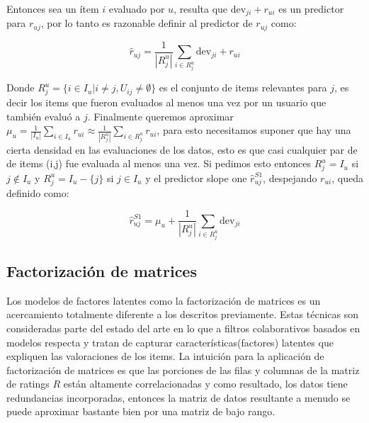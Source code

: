 \documentclass[hidelinks,12pt,a4paper]{book}
\theoremstyle{plain}
\theoremstyle{definition}
\begin{document}
Entonces sea un ítem $i$ evaluado por $u$, resulta que $\text{dev}_{ji}+r_{ui}$ es un predictor para $r_{uj}$, por lo tanto es razonable definir al predictor de $r_{uj}$ como:

\begin{equation}
\hat{r}_{uj} = \frac{1}{|R_j^u|} \sum_{i \in R_j^u} \text{dev}_{ji}+r_{ui}
\end{equation}

Donde $R_j^u=\{i\in I_u | i\neq j,U_{ij}\neq \emptyset \}$ es el conjunto de items relevantes para $j$, es decir los items que fueron evaluados al menos una vez por un usuario que también evaluó a $j$. Finalmente queremos aproximar $\mu_u=\frac{1}{|I_u|}\sum_{i \in I_u} r_{ui} \approx \frac{1}{|R_j^u|}\sum_{i \in R_j^u} r_{ui}$, para esto necesitamos suponer que hay una cierta densidad en las evaluaciones de los datos, esto es que casi cualquier par de de items (i,j) fue evaluada al menos una vez. Si pedimos esto entonces $R_j^u=I_u$ si $j\notin I_u$ y $R_j^u=I_u-\{j\}$ si $j\in I_u$ y el predictor slope one $\hat{r}_{uj}^{S1}$, despejando $r_{ui}$, queda definido como:

\begin{equation}
\hat{r}_{uj}^{S1} =\mu_u + \frac{1}{|R_j^u|} \sum_{i \in R_j^u} \text{dev}_{ji}
\end{equation}

\subsection{Factorización de matrices}

Los modelos de factores latentes como la factorización de matrices es un acercamiento totalmente diferente a los descritos previamente. Estas técnicas son consideradas parte del estado del arte en lo que a filtros colaborativos basados en modelos respecta\cite{agg} y tratan de capturar características(factores) latentes que expliquen las valoraciones de los items. La intuición para la aplicación de factorización de matrices es que las porciones de las filas y columnas de la matriz de ratings $R$ están altamente correlacionadas y como resultado, los datos tiene redundancias incorporadas, entonces la matriz de datos resultante a menudo se puede aproximar bastante bien por una matriz de bajo rango\footnotemark. 

\end{document}
